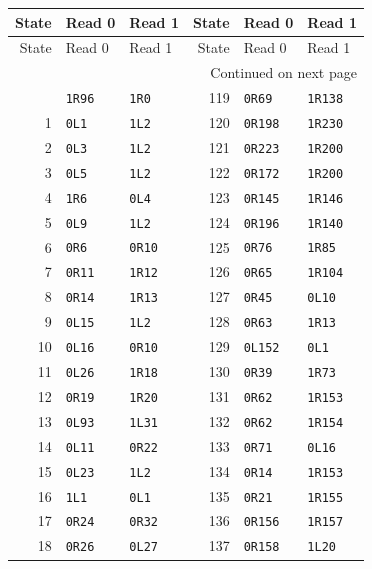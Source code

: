 \begingroup\small\setlength{\tabcolsep}{10pt}
\begin{longtable}{rll@{\qquad}rll}
\toprule State & Read 0 & Read 1 & State & Read 0 & Read 1\\\midrule
\endfirsthead
\toprule State & Read 0 & Read 1 & State & Read 0 & Read 1\\\midrule
\endhead
\midrule\multicolumn{6}{r}{Continued on next page}\\\endfoot
\bottomrule\endlastfoot
0 & \texttt{1R96} & \texttt{1R0} & 119 & \texttt{0R69} & \texttt{1R138}\\
1 & \texttt{0L1} & \texttt{1L2} & 120 & \texttt{0R198} & \texttt{1R230}\\
2 & \texttt{0L3} & \texttt{1L2} & 121 & \texttt{0R223} & \texttt{1R200}\\
3 & \texttt{0L5} & \texttt{1L2} & 122 & \texttt{0R172} & \texttt{1R200}\\
4 & \texttt{1R6} & \texttt{0L4} & 123 & \texttt{0R145} & \texttt{1R146}\\
5 & \texttt{0L9} & \texttt{1L2} & 124 & \texttt{0R196} & \texttt{1R140}\\
6 & \texttt{0R6} & \texttt{0R10} & 125 & \texttt{0R76} & \texttt{1R85}\\
7 & \texttt{0R11} & \texttt{1R12} & 126 & \texttt{0R65} & \texttt{1R104}\\
8 & \texttt{0R14} & \texttt{1R13} & 127 & \texttt{0R45} & \texttt{0L10}\\
9 & \texttt{0L15} & \texttt{1L2} & 128 & \texttt{0R63} & \texttt{1R13}\\
10 & \texttt{0L16} & \texttt{0R10} & 129 & \texttt{0L152} & \texttt{0L1}\\
11 & \texttt{0L26} & \texttt{1R18} & 130 & \texttt{0R39} & \texttt{1R73}\\
12 & \texttt{0R19} & \texttt{1R20} & 131 & \texttt{0R62} & \texttt{1R153}\\
13 & \texttt{0L93} & \texttt{1L31} & 132 & \texttt{0R62} & \texttt{1R154}\\
14 & \texttt{0L11} & \texttt{0R22} & 133 & \texttt{0R71} & \texttt{0L16}\\
15 & \texttt{0L23} & \texttt{1L2} & 134 & \texttt{0R14} & \texttt{1R153}\\
16 & \texttt{1L1} & \texttt{0L1} & 135 & \texttt{0R21} & \texttt{1R155}\\
17 & \texttt{0R24} & \texttt{0R32} & 136 & \texttt{0R156} & \texttt{1R157}\\
18 & \texttt{0R26} & \texttt{0L27} & 137 & \texttt{0R158} & \texttt{1L20}\\

\end{longtable}
